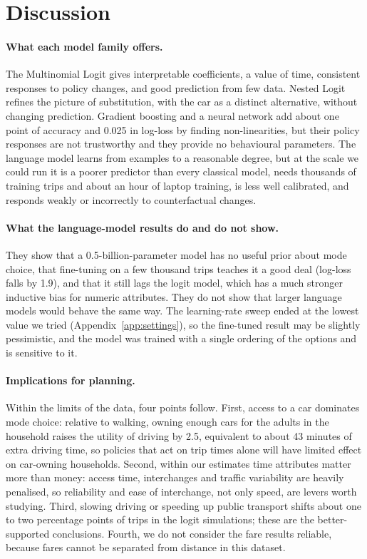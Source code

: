 \documentclass[11pt,a4paper]{article}
\begin{document}
\section{Discussion}
\label{sec:discussion}

\paragraph{What each model family offers.}
The Multinomial Logit gives interpretable coefficients, a value of time, consistent responses to policy changes, and good prediction from few data. Nested Logit refines the picture of substitution, with the car as a distinct alternative, without changing prediction. Gradient boosting and a neural network add about one point of accuracy and 0.025 in log-loss by finding non-linearities, but their policy responses are not trustworthy and they provide no behavioural parameters. The language model learns from examples to a reasonable degree, but at the scale we could run it is a poorer predictor than every classical model, needs thousands of training trips and about an hour of laptop training, is less well calibrated, and responds weakly or incorrectly to counterfactual changes.

\paragraph{What the language-model results do and do not show.}
They show that a 0.5-billion-parameter model has no useful prior about mode choice, that fine-tuning on a few thousand trips teaches it a good deal (log-loss falls by 1.9), and that it still lags the logit model, which has a much stronger inductive bias for numeric attributes. They do not show that larger language models would behave the same way. The learning-rate sweep ended at the lowest value we tried (Appendix~\ref{app:settings}), so the fine-tuned result may be slightly pessimistic, and the model was trained with a single ordering of the options and is sensitive to it.

\paragraph{Implications for planning.}
Within the limits of the data, four points follow. First, access to a car dominates mode choice: relative to walking, owning enough cars for the adults in the household raises the utility of driving by 2.5, equivalent to about 43 minutes of extra driving time, so policies that act on trip times alone will have limited effect on car-owning households. Second, within our estimates time attributes matter more than money: access time, interchanges and traffic variability are heavily penalised, so reliability and ease of interchange, not only speed, are levers worth studying. Third, slowing driving or speeding up public transport shifts about one to two percentage points of trips in the logit simulations; these are the better-supported conclusions. Fourth, we do not consider the fare results reliable, because fares cannot be separated from distance in this dataset.
\end{document}
